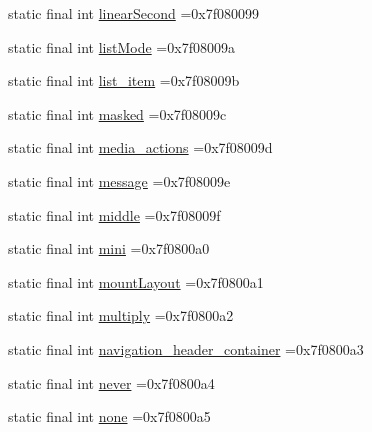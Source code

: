 \begin{DoxyCompactItemize}
\item 
static final int \mbox{\hyperlink{classcom_1_1example_1_1trainawearapplication_1_1_r_1_1id_a615555b0244a14d308b26fd5d058d9f5}{linear\+Second}} =0x7f080099
\item 
static final int \mbox{\hyperlink{classcom_1_1example_1_1trainawearapplication_1_1_r_1_1id_a57b0f6f868596aafb89826f2307b7aa4}{list\+Mode}} =0x7f08009a
\item 
static final int \mbox{\hyperlink{classcom_1_1example_1_1trainawearapplication_1_1_r_1_1id_a7a0e6ba877d61bfebe32c4745594fed8}{list\+\_\+item}} =0x7f08009b
\item 
static final int \mbox{\hyperlink{classcom_1_1example_1_1trainawearapplication_1_1_r_1_1id_a4a54eaa151f9e1842d480712976ea86b}{masked}} =0x7f08009c
\item 
static final int \mbox{\hyperlink{classcom_1_1example_1_1trainawearapplication_1_1_r_1_1id_af389fe86a5bf28a871b1239154f98518}{media\+\_\+actions}} =0x7f08009d
\item 
static final int \mbox{\hyperlink{classcom_1_1example_1_1trainawearapplication_1_1_r_1_1id_ac1f8a52fadacbe41ff62be1107c819a5}{message}} =0x7f08009e
\item 
static final int \mbox{\hyperlink{classcom_1_1example_1_1trainawearapplication_1_1_r_1_1id_a86689f130af73b24ca7c4fba28f1ea78}{middle}} =0x7f08009f
\item 
static final int \mbox{\hyperlink{classcom_1_1example_1_1trainawearapplication_1_1_r_1_1id_af16854273b240b72cedbb40e2121a505}{mini}} =0x7f0800a0
\item 
static final int \mbox{\hyperlink{classcom_1_1example_1_1trainawearapplication_1_1_r_1_1id_a54b3b15b617f13886a7516945f87e231}{mount\+Layout}} =0x7f0800a1
\item 
static final int \mbox{\hyperlink{classcom_1_1example_1_1trainawearapplication_1_1_r_1_1id_affd70f0204fae4a8a9d6121d23c6d61c}{multiply}} =0x7f0800a2
\item 
static final int \mbox{\hyperlink{classcom_1_1example_1_1trainawearapplication_1_1_r_1_1id_a98e5c8aa566d20b2f244084d73bfbd5b}{navigation\+\_\+header\+\_\+container}} =0x7f0800a3
\item 
static final int \mbox{\hyperlink{classcom_1_1example_1_1trainawearapplication_1_1_r_1_1id_a8e66202b23dfb639f9ea6074abbcedad}{never}} =0x7f0800a4
\item 
static final int \mbox{\hyperlink{classcom_1_1example_1_1trainawearapplication_1_1_r_1_1id_a96081210b11b70bf675c6a3d675dd668}{none}} =0x7f0800a5
\item 

\end{DoxyCompactItemize}
